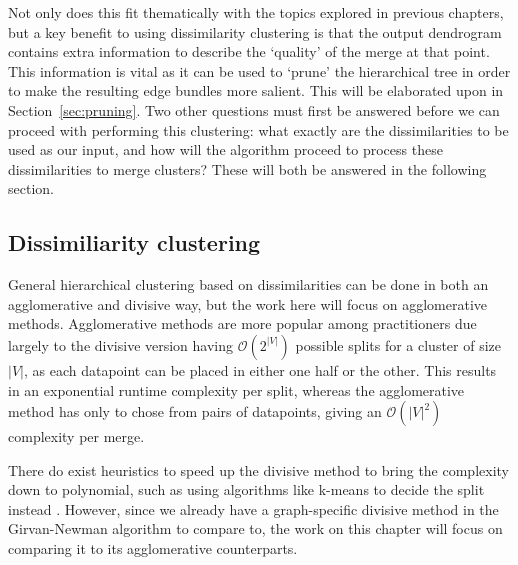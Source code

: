 Not only does this fit thematically with the topics explored in previous chapters, but a key benefit to using dissimilarity clustering is that the output dendrogram contains extra information to describe the `quality' of the merge at that point. This information is vital as it can be used to `prune' the hierarchical tree in order to make the resulting edge bundles more salient. This will be elaborated upon in Section~\ref{sec:pruning}.
Two other questions must first be answered before we can proceed with performing this clustering: what exactly are the dissimilarities to be used as our input, and how will the algorithm proceed to process these dissimilarities to merge clusters? These will both be answered in the following section.

\subsection{Dissimiliarity clustering}
\label{sec:dissimilarities}
General hierarchical clustering based on dissimilarities can be done in both an agglomerative and divisive way, but the work here will focus on agglomerative methods. Agglomerative methods are more popular among practitioners \cite{Roux2018} due largely to the divisive version having $\mathcal{O}(2^{|V|})$ possible splits for a cluster of size $|V|$, as each datapoint can be placed in either one half or the other. This results in an exponential runtime complexity per split, whereas the agglomerative method has only to chose from pairs of datapoints, giving an $\mathcal{O}(|V|^2)$ complexity per merge.

There do exist heuristics to speed up the divisive method to bring the complexity down to polynomial, such as using algorithms like k-means to decide the split instead \cite{Lamrous2006}.
However, since we already have a graph-specific divisive method in the Girvan-Newman algorithm to compare to, the work on this chapter will focus on comparing it to its agglomerative counterparts.

